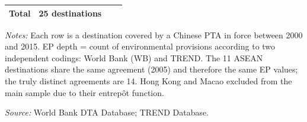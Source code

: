 \begin{table}[htbp]
\begin{threeparttable}
\begin{tabular}{llcc}
\midrule
\textbf{Total} & 25 destinations & & \\
\bottomrule
\end{tabular}
\begin{tablenotes}[flushleft]\footnotesize
\item \emph{Notes:} Each row is a destination covered by a Chinese PTA in force between 2000 and 2015. EP depth = count of environmental provisions according to two independent codings: World Bank (WB) and TREND. The 11 ASEAN destinations share the same agreement (2005) and therefore the same EP values; the truly distinct agreements are 14. Hong Kong and Macao excluded from the main sample due to their entrep\^ot function.
\item \textit{Source:} World Bank DTA Database; TREND Database.
\end{tablenotes}
\end{threeparttable}
\end{table}
